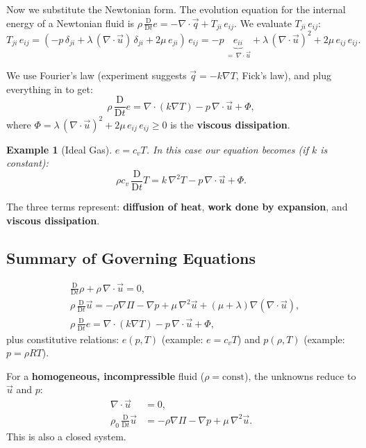 \documentclass[11pt,a4paper]{article}
\newtheorem{example}[theorem]{Example}
\newcommand{\D}{\mathrm{D}}
\newcommand{\Dt}{\frac{\D}{\D t}}
\newcommand{\uv}{\vec{u}}
\begin{document}
Now we substitute the Newtonian form. The evolution equation for the internal energy of a Newtonian fluid is $\rho\,\Dt e = -\nabla\cdot\vec{q} + T_{ji}\,e_{ij}$. We evaluate $T_{ji}\,e_{ij}$:
\[
    T_{ji}\,e_{ij} = (-p\,\delta_{ji} + \lambda\,(\nabla\cdot\uv)\,\delta_{ji} + 2\mu\,e_{ji})\,e_{ij}
    = -p\,\underbrace{e_{ii}}_{=\,\nabla\cdot\uv} + \lambda\,(\nabla\cdot\uv)^2 + 2\mu\,e_{ij}\,e_{ij}.
\]

We use Fourier's law (experiment suggests $\vec{q} = -k\nabla T$, Fick's law), and plug everything in to get:
\[
    \rho\,\Dt e = \nabla\cdot(k\nabla T) - p\,\nabla\cdot\uv + \Phi,
\]
where $\Phi = \lambda\,(\nabla\cdot\uv)^2 + 2\mu\,e_{ij}\,e_{ij} \geq 0$ is the \textbf{viscous dissipation}.

\begin{example}[Ideal Gas]
$e = c_v T$. In this case our equation becomes (if $k$ is constant):
\[
    \boxed{\rho c_v\, \Dt T = k\,\nabla^2 T - p\,\nabla\cdot\uv + \Phi.}
\]
\end{example}

The three terms represent: \textbf{diffusion of heat}, \textbf{work done by expansion}, and \textbf{viscous dissipation}.

\subsection{Summary of Governing Equations}

\begin{align}
    &\Dt\rho + \rho\,\nabla\cdot\uv = 0, \tag{Mass}\\
    &\rho\,\Dt\uv = -\rho\nabla\Pi - \nabla p + \mu\,\nabla^2\uv + (\mu+\lambda)\nabla(\nabla\cdot\uv), \tag{Momentum}\\
    &\rho\,\Dt e = \nabla\cdot(k\nabla T) - p\,\nabla\cdot\uv + \Phi, \tag{Energy}
\end{align}
plus constitutive relations: $e(p,T)$ (example: $e = c_v T$) and $p(\rho, T)$ (example: $p = \rho R T$).

For a \textbf{homogeneous, incompressible} fluid ($\rho = \text{const}$), the unknowns reduce to $\uv$ and $p$:
\begin{align}
    \nabla\cdot\uv &= 0, \tag{Mass}\\
    \rho_0\,\Dt\uv &= -\rho\nabla\Pi - \nabla p + \mu\,\nabla^2\uv. \tag{Momentum}
\end{align}
This is also a closed system.

\end{document}

